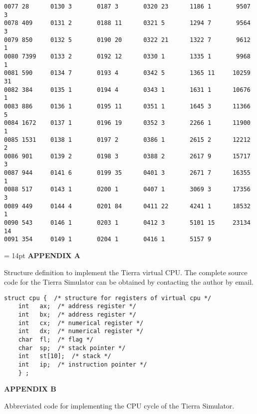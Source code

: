 \begin{verbatim}
0077 28      0130 3       0187 3       0320 23      1186 1       9507 3
0078 409     0131 2       0188 11      0321 5       1294 7       9564 3
0079 850     0132 5       0190 20      0322 21      1322 7       9612 1
0080 7399    0133 2       0192 12      0330 1       1335 1       9968 1
0081 590     0134 7       0193 4       0342 5       1365 11     10259 31
0082 384     0135 1       0194 4       0343 1       1631 1      10676 1
0083 886     0136 1       0195 11      0351 1       1645 3      11366 5
0084 1672    0137 1       0196 19      0352 3       2266 1      11900 1
0085 1531    0138 1       0197 2       0386 1       2615 2      12212 2
0086 901     0139 2       0198 3       0388 2       2617 9      15717 3
0087 944     0141 6       0199 35      0401 3       2671 7      16355 1
0088 517     0143 1       0200 1       0407 1       3069 3      17356 3
0089 449     0144 4       0201 84      0411 22      4241 1      18532 1
0090 543     0146 1       0203 1       0412 3       5101 15     23134 14
0091 354     0149 1       0204 1       0416 1       5157 9
\end{verbatim}

\newpage

\baselineskip = 14pt
\LP
\bf APPENDIX A\rm
\eLP

Structure definition to implement the Tierra virtual CPU.
The complete source code for the Tierra Simulator can be obtained by
contacting the author by email.

\begin{verbatim}
struct cpu {  /* structure for registers of virtual cpu */
    int   ax;  /* address register */
    int   bx;  /* address register */
    int   cx;  /* numerical register */
    int   dx;  /* numerical register */
    char  fl;  /* flag */
    char  sp;  /* stack pointer */
    int   st[10];  /* stack */
    int   ip;  /* instruction pointer */
    } ;
\end{verbatim}

\LP
\bf APPENDIX B\rm
\eLP

Abbreviated code for implementing the CPU cycle of the Tierra Simulator.

